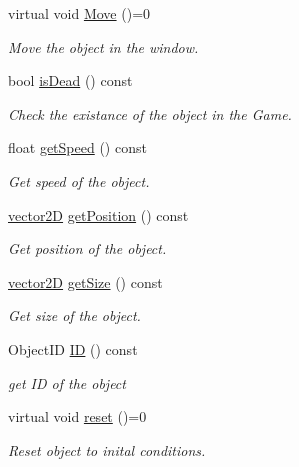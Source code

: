 \begin{DoxyCompactItemize}
\mbox{\label{class_game_object_a4bc279e0b3da8273e4e869cc7584847d}} 
virtual void \mbox{\hyperlink{class_game_object_a4bc279e0b3da8273e4e869cc7584847d}{Move}} ()=0
\begin{DoxyCompactList}\small\item\em Move the object in the window. \end{DoxyCompactList}\item 
bool \mbox{\hyperlink{class_game_object_a4a33322fbd4fe9d0d99b56ce872f7d4b}{is\+Dead}} () const
\begin{DoxyCompactList}\small\item\em Check the existance of the object in the Game. \end{DoxyCompactList}\item 
float \mbox{\hyperlink{class_game_object_a70800bd43cf0b786bf6d0f172072b682}{get\+Speed}} () const
\begin{DoxyCompactList}\small\item\em Get speed of the object. \end{DoxyCompactList}\item 
\mbox{\hyperlink{classvector2_d}{vector2D}} \mbox{\hyperlink{class_game_object_a384f1b162b685cbeb8f0c70c03392664}{get\+Position}} () const
\begin{DoxyCompactList}\small\item\em Get position of the object. \end{DoxyCompactList}\item 
\mbox{\hyperlink{classvector2_d}{vector2D}} \mbox{\hyperlink{class_game_object_a2df595e48b25e0377757471f75d89e15}{get\+Size}} () const
\begin{DoxyCompactList}\small\item\em Get size of the object. \end{DoxyCompactList}\item 
Object\+ID \mbox{\hyperlink{class_game_object_a0c8139d67c763ff80cd384000b908a36}{ID}} () const
\begin{DoxyCompactList}\small\item\em get ID of the object \end{DoxyCompactList}\item 
\mbox{\label{class_game_object_a3d1fb8fcc7bf0c07b4e619d7dec56b56}} 
virtual void \mbox{\hyperlink{class_game_object_a3d1fb8fcc7bf0c07b4e619d7dec56b56}{reset}} ()=0
\begin{DoxyCompactList}\small\item\em Reset object to inital conditions. \end{DoxyCompactList}\item 

\end{DoxyCompactItemize}
